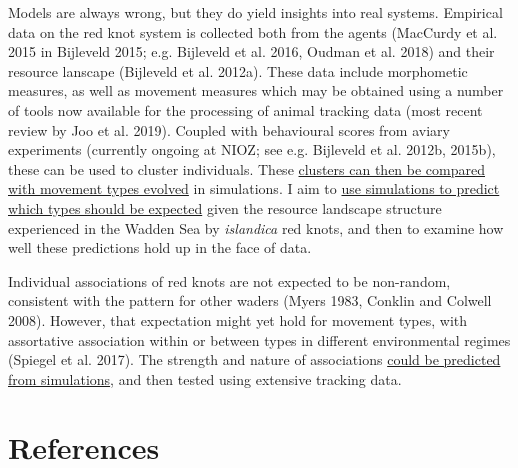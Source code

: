 \documentclass[]{scrartcl}
\begin{document}
\begin{linenumbers}
Models are always wrong, but they do yield insights into real systems.
Empirical data on the red knot system is collected both from the agents
(\protect\hypertarget{__UnoMark__4370_580056431}{}{}MacCurdy et al. 2015
in \protect\hypertarget{__UnoMark__4377_580056431}{}{}Bijleveld 2015;
e.g. \protect\hypertarget{__UnoMark__4384_580056431}{}{}Bijleveld et al.
2016, Oudman et al. 2018) and their resource lanscape
(\protect\hypertarget{__UnoMark__4391_580056431}{}{}Bijleveld et al.
2012a). These data include morphometic measures, as well as movement
measures which may be obtained using a number of tools now available for
the processing of animal tracking data (most recent review by
\protect\hypertarget{__UnoMark__4398_580056431}{}{}Joo et al. 2019).
Coupled with behavioural scores from aviary experiments (currently
ongoing at NIOZ; see e.g.
\protect\hypertarget{__UnoMark__4405_580056431}{}{}Bijleveld et al.
2012b, 2015b), these can be used to cluster individuals. These
\underline{clusters can then be compared with movement types evolved} in
simulations. I aim to \underline{use simulations to predict which types
should be expected} given the resource landscape structure experienced
in the Wadden Sea by \emph{islandica} red knots, and then to examine how
well these predictions hold up in the face of data.

Individual associations of red knots are not expected to be non-random,
consistent with the pattern for other waders
(\protect\hypertarget{__UnoMark__4412_580056431}{}{}Myers 1983, Conklin
and Colwell 2008). However, that expectation might yet hold for movement
types, with assortative association within or between types in different
environmental regimes
(\protect\hypertarget{__UnoMark__4419_580056431}{}{}Spiegel et al.
2017). The strength and nature of associations \underline{could be predicted from simulations}, and then tested using extensive tracking data.

\end{linenumbers}

\newpage

\part{References}\label{references}
\end{document}
